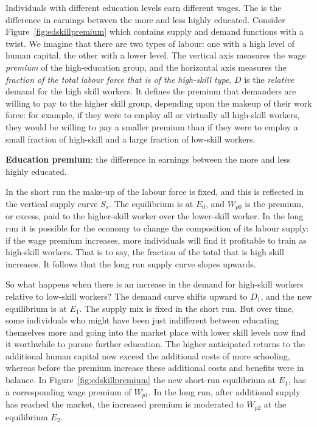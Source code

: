 Individuals with different education levels earn different wages. The  is the difference in earnings between the more and less highly educated. Consider Figure~\ref{fig:edskillpremium} which contains supply and demand functions with a twist. We imagine that there are two types of labour: one with a high level of human capital, the other with a lower level. The vertical axis measures the wage \textit{premium} of the high-education group, and the horizontal axis measures the \textit{fraction of the total labour force that is of the high-skill type}. $D$ is the \textit{relative} demand for the high skill workers. It defines the premium that demanders are willing to pay to the higher skill group, depending upon the makeup of their work force: for example, if they were to employ all or virtually all high-skill workers, they would be willing to pay a smaller premium than if they were to employ a small fraction of high-skill and a large fraction of low-skill workers.



\begin{DefBox}
\textbf{Education premium}: the difference in earnings between the more and less highly educated.
\end{DefBox}

In the short run the make-up of the labour force is fixed, and this is reflected in the vertical supply curve $S_s$. The equilibrium is at $E_0$, and $W_{p0}$ is the premium, or excess, paid to the higher-skill worker over the lower-skill worker. In the long run it is possible for the economy to change the composition of its labour supply: if the wage premium increases, more individuals will find it profitable to train as high-skill workers. That is to say, the fraction of the total that is high skill increases. It follows that the long run supply curve slopes upwards.

So what happens when there is an increase in the demand for high-skill workers relative to low-skill workers? The demand curve shifts upward to $D_1$, and the new equilibrium is at $E_1$. The supply mix is fixed in the short run. But over time, some individuals who might have been just indifferent between educating themselves more and going into the market place with lower skill levels now find it worthwhile to pursue further education. The higher anticipated returns to the additional human capital now exceed the additional costs of more schooling, whereas before the premium increase these additional costs and benefits were in balance. In Figure~\ref{fig:edskillpremium} the new short-run equilibrium at $E_1$, has a corresponding wage premium of $W_{p1}$. In the long run, after additional supply has reached the market, the increased premium is moderated to $W_{p2}$ at the equilibrium $E_2$.  

